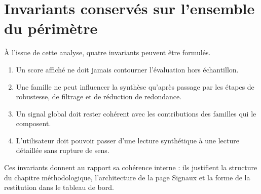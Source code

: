 \section{Invariants conservés sur l'ensemble du périmètre}
À l'issue de cette analyse, quatre invariants peuvent être formulés.
\begin{enumerate}
\item Un score affiché ne doit jamais contourner l'évaluation hors échantillon.
\item Une famille ne peut influencer la synthèse qu'après passage par les étapes
de robustesse, de filtrage et de réduction de redondance.
\item Un signal global doit rester cohérent avec les contributions des familles
qui le composent.
\item L'utilisateur doit pouvoir passer d'une lecture synthétique à une lecture
détaillée sans rupture de sens.
\end{enumerate}

Ces invariants donnent au rapport sa cohérence interne : ils justifient la
structure du chapitre méthodologique, l'architecture de la page Signaux et la
forme de la restitution dans le tableau de bord.
